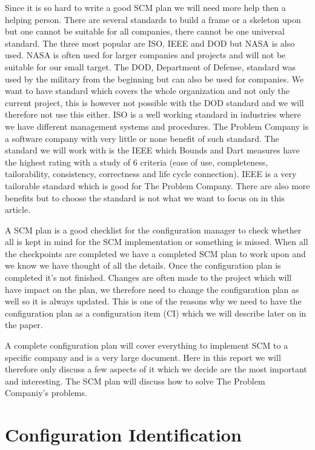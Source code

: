 \documentclass[a4paper,10pt]{article}
\begin{document}
Since it is so hard to write a good SCM plan we will need more help then a helping person.
There are several standards to build a frame or a skeleton upon but one cannot be suitable for all companies, there cannot be one universal standard.
The three most popular are ISO, IEEE and DOD but NASA is also used. \cite{SCMPLAN}
NASA is often used for larger companies and projects and will not be suitable for our small target. The DOD, Department of Defense, standard was used by the military from the beginning but can also be used for companies. We want to have  standard which covers the whole organization and not only the current project, this is however not possible with the DOD standard and we will therefore not use this either.
ISO is a well working standard in industries where we have different management systems and procedures. The Problem Company is a software company with very little or none benefit of such standard.
The standard we will work with is the IEEE which Bounds and Dart measures have the highest rating with a study of 6 criteria (ease of use, completeness, tailorability, consistency, correctness and life cycle connection). IEEE is a very tailorable standard which is good for The Problem Company. There are also more benefits but to choose the standard is not what we want to focus on in this article.

A SCM plan is a good checklist for the configuration manager to check whether all is kept in mind for the SCM implementation or something is missed. When all the checkpoints are completed we have a completed SCM plan to work upon and we know we have thought of all the details. Once the configuration plan is completed it’s not finished. Changes are often made to the project which will have impact on the plan, we therefore need to change the configuration plan as well so it is always updated. This is one of the reasons why we need to have the configuration plan as a configuration item (CI) which we will describe later on in the paper.

A complete configuration plan will cover everything to implement SCM to a specific company and is a very large document. Here in this report we will therefore only discuss a few aspects of it which we decide are the most important and interesting. The SCM plan will discuss how to solve The Problem Companiy's problems.



\section{Configuration Identification}
\end{document}
